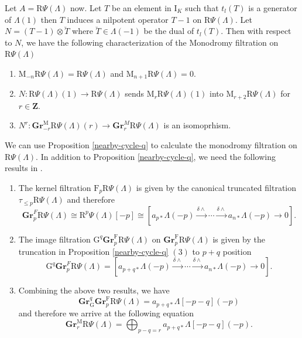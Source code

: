 \documentclass[10pt]{amsart}
\newcommand*\Z{\mathds{Z}}
\newcommand*\ZZ{|[draw,circle]| \Z_2}
\numberwithin{equation}{section}
\theoremstyle{plain}
\numberwithin{equation}{section}
\theoremstyle{definition}
\theoremstyle{remark}
\def\ZZ{\mathbf{Z}}
\def\rmG{\mathrm{G}}
\def\rmI{\mathrm{I}}
\def\rmF{\mathrm{F}}
\def\rmM{\mathrm{M}}
\def\rmR{\mathrm{R}}
\newcommand{\Gr}{\mathbf{Gr}}
\begin{document}
Let $A=\rmR\Psi(\Lambda)$ now. Let $T$ be an element in $\rmI_{K}$ such that $t_{l}(T)$ is a generator of $\Lambda(1)$ then $T$ induces a nilpotent operator $T-1$ on $\rmR\Psi(\Lambda)$. Let $N=(T-1)\otimes\breve{T}$ where $\breve{T}\in \Lambda(-1)$ be the dual of $t_{l}(T)$. Then with respect to $N$, we have the following characterization of the Monodromy filtration on $\rmR\Psi(\Lambda)$
\begin{enumerate}
\item $\rmM_{-n}\rmR\Psi(\Lambda)=\rmR\Psi(\Lambda)$ and $\rmM_{n+1}\rmR\Psi(\Lambda)=0$.
\item $N: \rmR\Psi(\Lambda)(1)\rightarrow \rmR\Psi(\Lambda)$ sends $\rmM_{r}\rmR\Psi(\Lambda)(1)$ into $\rmM_{r+2}\rmR\Psi(\Lambda)$ for $r\in\ZZ$.
\item $N^{r}: \Gr^{\rmM}_{-r}\rmR\Psi(\Lambda)(r)\rightarrow \Gr^{M}_{r}\rmR\Psi(\Lambda)$ is an isomoprhism. 
\end{enumerate}
We can use Proposition \ref{nearby-cycle-q} to calculate the monodromy filtration on $\rmR\Psi(\Lambda)$. In addition to Proposition \ref{nearby-cycle-q}, we need the following results in \cite[Lemma 2.5, Corollary 2.6]{Saito}. 
\begin{enumerate}
\item The kernel filtration $\rmF_{p}\rmR\Psi(\Lambda)$ is given by the canonical truncated filtration $\tau_{\leq p}\rmR\Psi(\Lambda)$ and therefore 
\begin{equation*}
\Gr^{F}_{p}\rmR\Psi(\Lambda)\cong \rmR^{p}\Psi(\Lambda)[-p]\cong [a_{p*}\Lambda(-p)\xrightarrow{\delta\wedge}\cdots\xrightarrow{\delta\wedge} a_{n*}\Lambda(-p)\rightarrow0].
\end{equation*}
\item The image filtration $\rmG^{q}\Gr^{\rmF}_{p}\rmR\Psi(\Lambda)$ on $\Gr^{\rmF}_{p}\rmR\Psi(\Lambda)$ is given by the truncation in Proposition \ref{nearby-cycle-q} $(3)$ to $p+q$ position
\begin{equation*}
\rmG^{q}\Gr^{F}_{p}\rmR\Psi(\Lambda)= [a_{p+q*}\Lambda(-p)\xrightarrow{\delta\wedge}\cdots\xrightarrow{\delta\wedge} a_{n*}\Lambda(-p)\rightarrow0].
\end{equation*}
\item Combining the above two results, we have 
\begin{equation*}
\Gr^{q}_{\rmG}\Gr^{\rmF}_{p}\rmR\Psi(\Lambda)=a_{p+q*}\Lambda[-p-q](-p)
\end{equation*}
and therefore we arrive at the following equation 
\begin{equation}\label{Graded-M}
\Gr^{\rmM}_{r}\rmR\Psi(\Lambda)=\bigoplus_{p-q=r}a_{p+q*}\Lambda[-p-q](-p).
\end{equation}
\end{enumerate}
\end{document}
